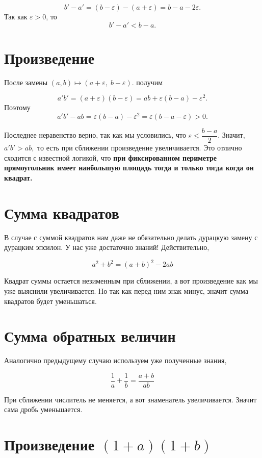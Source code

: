 \[
b'-a'=(b-\varepsilon)-(a+\varepsilon)=b-a-2\varepsilon.
\]
Так как $\varepsilon>0$, то
\[
b'-a'<b-a.
\]

\medskip

\section{Произведение}
После замены $(a,b)\longmapsto (a+\varepsilon,\; b-\varepsilon).$ получим

\[
a'b'=(a+\varepsilon)(b-\varepsilon)
=ab+\varepsilon(b-a)-\varepsilon^2.
\]
Поэтому
\[
a'b'-ab=\varepsilon(b-a)-\varepsilon^2
=\varepsilon(b-a-\varepsilon)>0.
\]

Последнее неравенство верно, так как мы условились, что $\varepsilon \leqslant \dfrac{b-a}{2}$. Значит, $a'b'>ab,$ то есть при сближении произведение увеличивается. Это отлично сходится с известной логикой, что \textbf{при фиксированном периметре прямоугольник имеет наибольшую площадь тогда и только тогда когда он квадрат.}
\medskip

\section{Сумма квадратов}

В случае с суммой квадратов нам даже не обязательно делать дурацкую замену с дурацким эпсилон. У нас уже достаточно знаний! Действительно,

$$
a^2 + b^2 = (a+b)^2 - 2ab
$$

Квадрат суммы остается незименным при сближении, а вот произведение как мы уже выяснили увеличивается. Но так как перед ним знак минус, значит сумма квадратов будет уменьшаться.

\medskip

\section{Сумма обратных величин}

Аналогично предыдущему случаю используем уже полученные знания,

$$
\dfrac{1}{a} + \dfrac{1}{b} = \dfrac{a+b}{ab}
$$

При сближении числитель не меняется, а вот знаменатель увеличивается. Значит сама дробь уменьшается.

\medskip

\section{Произведение $(1+a)(1+b)$}

